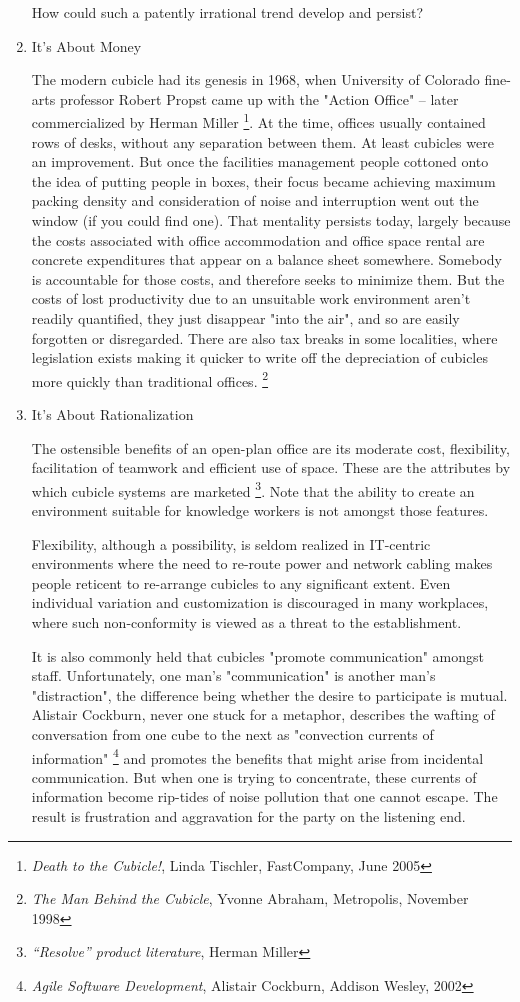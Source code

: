 \documentclass{article}
\begin{document}
\begin{enumerate}
How could such a patently irrational trend develop and persist?

\item It's About Money
\label{sec:orgheadline53}

The modern cubicle had its genesis in 1968, when University of Colorado
fine-arts professor Robert Propst came up with the "Action Office" --
later commercialized by Herman Miller \footnote{\emph{Death to the Cubicle!}, Linda Tischler, FastCompany, June 2005}. At the time, offices usually
contained rows of desks, without any separation between them. At least
cubicles were an improvement. But once the facilities management people
cottoned onto the idea of putting people in boxes, their focus became
achieving maximum packing density and consideration of noise and
interruption went out the window (if you could find one). That mentality
persists today, largely because the costs associated with office
accommodation and office space rental are concrete expenditures that
appear on a balance sheet somewhere. Somebody is accountable for those
costs, and therefore seeks to minimize them. But the costs of lost
productivity due to an unsuitable work environment aren't readily
quantified, they just disappear "into the air", and so are easily
forgotten or disregarded. There are also tax breaks in some localities,
where legislation exists making it quicker to write off the depreciation
of cubicles more quickly than traditional offices. \footnote{\emph{The Man Behind the Cubicle}, Yvonne Abraham, Metropolis, November
1998}

\item It's About Rationalization
\label{sec:orgheadline54}

The ostensible benefits of an open-plan office are its moderate cost,
flexibility, facilitation of teamwork and efficient use of space. These
are the attributes by which cubicle systems are marketed \footnote{\emph{“Resolve” product literature}, Herman Miller}. Note that
the ability to create an environment suitable for knowledge workers is
not amongst those features.

Flexibility, although a possibility, is seldom realized in IT-centric
environments where the need to re-route power and network cabling makes
people reticent to re-arrange cubicles to any significant extent. Even
individual variation and customization is discouraged in many
workplaces, where such non-conformity is viewed as a threat to the
establishment.

It is also commonly held that cubicles "promote communication" amongst
staff. Unfortunately, one man's "communication" is another man's
"distraction", the difference being whether the desire to participate is
mutual. Alistair Cockburn, never one stuck for a metaphor, describes the
wafting of conversation from one cube to the next as "convection
currents of information" \footnote{\emph{Agile Software Development}, Alistair Cockburn, Addison Wesley,
2002} and promotes the benefits that might arise
from incidental communication. But when one is trying to concentrate,
these currents of information become rip-tides of noise pollution that
one cannot escape. The result is frustration and aggravation for the
party on the listening end.


\end{enumerate}
\end{document}
